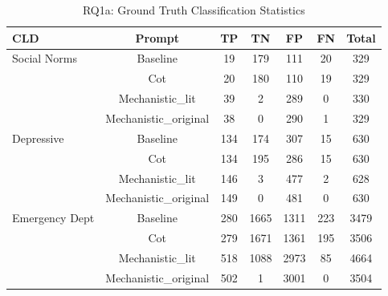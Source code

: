 \begin{table}[htbp]
\centering
\caption{RQ1a: Ground Truth Classification Statistics}
\label{tab:rq1a_gt_classification}
\begin{tabular}{lcccccc}
\toprule
\textbf{CLD} & \textbf{Prompt} & \textbf{TP} & \textbf{TN} & \textbf{FP} & \textbf{FN} & \textbf{Total} \\
\midrule
Social Norms & Baseline & 19 & 179 & 111 & 20 & 329 \\
 & Cot & 20 & 180 & 110 & 19 & 329 \\
 & Mechanistic_lit & 39 & 2 & 289 & 0 & 330 \\
 & Mechanistic_original & 38 & 0 & 290 & 1 & 329 \\
\midrule
Depressive & Baseline & 134 & 174 & 307 & 15 & 630 \\
 & Cot & 134 & 195 & 286 & 15 & 630 \\
 & Mechanistic_lit & 146 & 3 & 477 & 2 & 628 \\
 & Mechanistic_original & 149 & 0 & 481 & 0 & 630 \\
\midrule
Emergency Dept & Baseline & 280 & 1665 & 1311 & 223 & 3479 \\
 & Cot & 279 & 1671 & 1361 & 195 & 3506 \\
 & Mechanistic_lit & 518 & 1088 & 2973 & 85 & 4664 \\
 & Mechanistic_original & 502 & 1 & 3001 & 0 & 3504 \\
\midrule
\bottomrule
\end{tabular}
\end{table}